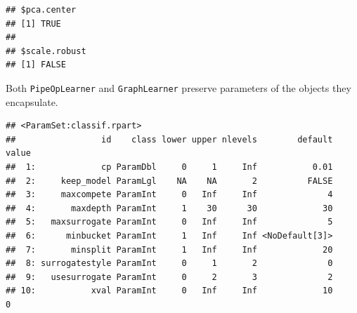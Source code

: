 \documentclass[
]{scrbook}
\newenvironment{Shaded}{\begin{snugshade}}{\end{snugshade}}
\newcommand{\FunctionTok}[1]{\textcolor[rgb]{0.00,0.00,0.00}{#1}}
\newcommand{\NormalTok}[1]{#1}
\newcommand{\OtherTok}[1]{\textcolor[rgb]{0.56,0.35,0.01}{#1}}
\newcommand{\SpecialCharTok}[1]{\textcolor[rgb]{0.00,0.00,0.00}{#1}}
\newcommand{\StringTok}[1]{\textcolor[rgb]{0.31,0.60,0.02}{#1}}
\renewenvironment{Shaded} {\begin{snugshade}\small} {\end{snugshade}}
\begin{document}
\begin{Shaded}
\end{Shaded}

\begin{verbatim}
## $pca.center
## [1] TRUE
## 
## $scale.robust
## [1] FALSE
\end{verbatim}

Both \texttt{PipeOpLearner} and \texttt{GraphLearner} preserve parameters of the objects they encapsulate.

\begin{Shaded}
\end{Shaded}

\begin{verbatim}
## <ParamSet:classif.rpart>
##                 id    class lower upper nlevels        default value
##  1:             cp ParamDbl     0     1     Inf           0.01      
##  2:     keep_model ParamLgl    NA    NA       2          FALSE      
##  3:     maxcompete ParamInt     0   Inf     Inf              4      
##  4:       maxdepth ParamInt     1    30      30             30      
##  5:   maxsurrogate ParamInt     0   Inf     Inf              5      
##  6:      minbucket ParamInt     1   Inf     Inf <NoDefault[3]>      
##  7:       minsplit ParamInt     1   Inf     Inf             20      
##  8: surrogatestyle ParamInt     0     1       2              0      
##  9:   usesurrogate ParamInt     0     2       3              2      
## 10:           xval ParamInt     0   Inf     Inf             10     0
\end{verbatim}

\begin{Shaded}
\end{Shaded}
\end{document}
